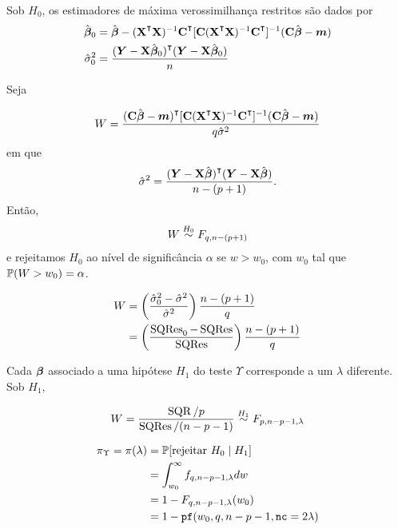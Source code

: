\begin{theorem} 
	Sob $H_0$, os estimadores de máxima verossimilhança restritos são dados por
	\begin{align}
		\hat{\v{\beta}}_0 &= \hat{\v{\beta}} - (\m{X}\T\m{X})\inv \m{C}\T [\m{C} (\m{X}\T\m{X})\inv\m{C}\T]\inv(\m{C}\hat{\v{\beta}}-\v{m})  \\
		\hat{\sigma}^2_0 &= \frac{(\v{Y}-\m{X}\hat{\v{\beta}}_0)\T(\v{Y}-\m{X}\hat{\v{\beta}}_0)}{n}
	\end{align}
\end{theorem}

\begin{theorem}[TRV]
	Seja
	
	\begin{equation}
		W = \frac{(\m{C}\hat{\v{\beta}}-\v{m})\T [\m{C}(\m{X}\T \m{X})\inv \m{C}\T]\inv (\m{C}\hat{\v{\beta}}-\v{m})}{q\hat{\sigma}^2}
	\end{equation}
	em que
	\begin{equation}
		\hat{\sigma}^2 = \frac{(\v{Y}-\m{X}\hat{\v{\beta}})\T(\v{Y}-\m{X}\hat{\v{\beta}})}{n-(p+1)}.
	\end{equation}
	Então,
	\begin{equation}
		W \undernull \fdist{q,n-(p+1)}
	\end{equation}
	e rejeitamos $H_0$ ao nível de significância $\alpha$ se $w > w_0$, com $w_0$ tal que $\P(W > w_0)=\alpha$.
\end{theorem}

\begin{theorem}
	\leavevmode
	\begin{align}
		W &= \left(\frac{\hat{\sigma}^2_0-\hat{\sigma}^2}{\hat{\sigma}^2} \right) \frac{n-(p+1)}{q} \\
		&= \left( \frac{\sqres_0-\sqres}{\sqres} \right) \frac{n-(p+1)}{q}
	\end{align}
\end{theorem}


\begin{theorem}
	Cada $\v{\beta}$ associado a uma hipótese $H_1$ do teste $\Upsilon$ corresponde a um $\lambda$ diferente. Sob $H_1$,
	
	\begin{equation}
		W = \frac{\sqr/p}{\sqres/(n-p-1)} \underalt \fdist{p, n-p-1, \lambda}
	\end{equation}
	
	\begin{align}
		\pi_{\Upsilon} = \pi(\lambda) &= \P[\text{rejeitar } H_0 \mid H_1] \\
		&= \int_{w_0}^{\infty} f_{q,n-p-1,\lambda}  dw \\
		&= 1-F_{q,n-p-1,\lambda}(w_0) \\
		&= 1-\texttt{pf}(w_0, q, n-p-1, \texttt{nc}=2\lambda)
	\end{align}
	
\end{theorem}

